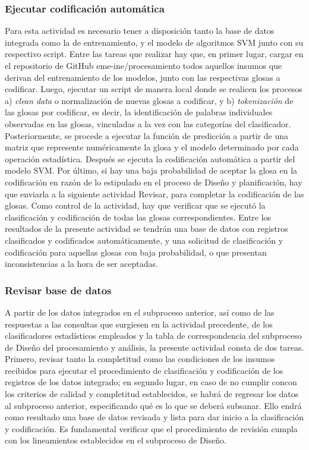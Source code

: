 \documentclass[
]{article}
\begin{document}
\hypertarget{ejecutar-codificaciuxf3n-automuxe1tica}{%
\subsubsection{Ejecutar codificación automática}\label{ejecutar-codificaciuxf3n-automuxe1tica}}

Para esta actividad es necesario tener a disposición tanto la base de datos integrada como la de entrenamiento, y el modelo de algoritmos SVM junto con su respectivo script. Entre las tareas que realizar hay que, en primer lugar, cargar en el repositorio de GitHub eme-ine/procesamiento todos aquellos insumos que derivan del entrenamiento de los modelos, junto con las respectivas glosas a codificar. Luego, ejecutar un script de manera local donde se realicen los procesos a) \emph{clean data} o normalización de nuevas glosas a codificar, y b) \emph{tokenización} de las glosas por codificar, es decir, la identificación de palabras individuales observadas en las glosas, vinculadas a la vez con las categorías del clasificador. Posteriormente, se procede a ejecutar la función de predicción a partir de una matriz que represente numéricamente la glosa y el modelo determinado por cada operación estadística. Después se ejecuta la codificación automática a partir del modelo SVM. Por último, si hay una baja probabilidad de aceptar la glosa en la codificación en razón de lo estipulado en el proceso de Diseño y planificación, hay que enviarla a la siguiente actividad Revisar, para completar la codificación de las glosas. Como control de la actividad, hay que verificar que se ejecutó la clasificación y codificación de todas las glosas correspondientes. Entre los resultados de la presente actividad se tendrán una base de datos con registros clasificados y codificados automáticamente, y una solicitud de clasificación y codificación para aquellas glosas con baja probabilidad, o que presentan inconsistencias a la hora de ser aceptadas.

\hypertarget{revisar-base-de-datos}{%
\subsubsection{Revisar base de datos}\label{revisar-base-de-datos}}

A partir de los datos integrados en el subproceso anterior, así como de las respuestas a las consultas que surgiesen en la actividad precedente, de los clasificadores estadísticos empleados y la tabla de correspondencia del subproceso de Diseño del procesamiento y análisis, la presente actividad consta de dos tareas. Primero, revisar tanto la completitud como las condiciones de los insumos recibidos para ejecutar el procedimiento de clasificación y codificación de los registros de los datos integrado; en segundo lugar, en caso de no cumplir concon los criterios de calidad y completitud establecidos, se habrá de regresar los datos al subproceso anterior, especificando qué es lo que se deberá subsanar. Ello endrá como resultado una base de datos revisada y lista para dar inicio a la clasificación y codificación. Es fundamental verificar que el procedimiento de revisión cumpla con los lineamientos establecidos en el subproceso de Diseño.
\end{document}

